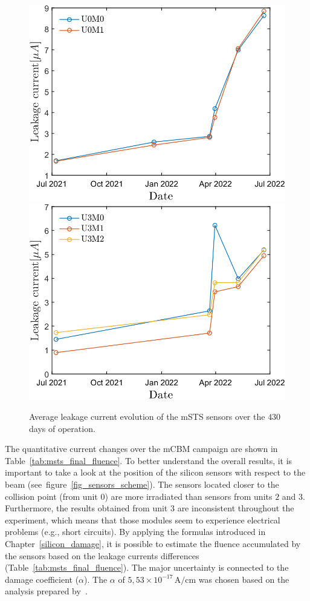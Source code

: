 \begin{figure}[!h]
\centering
\includegraphics[width=0.48\columnwidth]{Chapter6/DCS/images/sensors/U0_leakage.png}
\includegraphics[width=0.48\columnwidth]{Chapter6/DCS/images/sensors/U3_leakage.png}
\caption{Average leakage current evolution of the \gls{mSTS} sensors over the $430$ days of operation. }
\label{fig_leak}
\end{figure}

The quantitative current changes over the \gls{mCBM} campaign are shown in Table~\ref{tab:msts_final_fluence}. To better understand the overall results, it is important to take a look at the position of the silicon sensors with respect to the beam (see~figure~\ref{fig_sensors_scheme}). The sensors located closer to the collision point (from unit $0$) are more irradiated than sensors from units $2$ and $3$. Furthermore, the results obtained from unit $3$ are inconsistent throughout the experiment, which means that those modules seem to experience electrical problems (e.g., short circuits). By applying the formulas introduced in Chapter~\ref{silicon_damage}, it is possible to estimate the fluence accumulated by the sensors based on the leakage currents differences (Table~\ref{tab:msts_final_fluence}).
The major uncertainty is connected to the damage coefficient ($\alpha$). The $\alpha$ of $5,53\times 10^{-17}\,\mathrm{A/cm}$ was chosen based on the analysis prepared by~\cite{Larionov:2016eoz}. 

